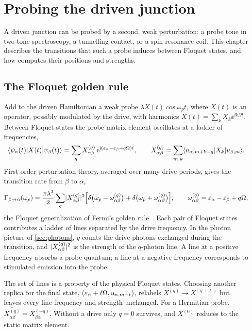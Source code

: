 \chapter{Probing the driven junction}\label{ch:probes}

A driven junction can be probed by a second, weak perturbation: a probe tone in two-tone
spectroscopy, a tunnelling contact, or a spin-resonance coil. This chapter describes the
transitions that such a probe induces between Floquet states, and how \pkg{} computes
their positions and strengths.

\section{The Floquet golden rule}

Add to the driven Hamiltonian a weak probe $\lambda X(t)\cos\omega_pt$, where $X(t)$ is an
operator, possibly modulated by the drive, with harmonics $X(t)=\sum_kX_k\ee^{\ii k\Omega t}$.
Between Floquet states the probe matrix element oscillates at a ladder of frequencies,
\begin{equation}\label{eq:floquet-element}
  \langle \psi_\alpha(t)\vert X(t)\vert \psi_\beta(t)\rangle=\sum_qX^{(q)}_{\alpha\beta}\,
  \mathrm{e}^{\mathrm{i}(\varepsilon_\alpha-\varepsilon_\beta+q\Omega)t},\qquad
  X^{(q)}_{\alpha\beta}=\sum_{m,k}\langle u_{\alpha,m+k-q}\vert X_k\vert u_{\beta,m}\rangle .
\end{equation}
First-order perturbation theory, averaged over many drive periods, gives the transition rate
from $\beta$ to $\alpha$,
\begin{equation}\label{eq:floquet-golden}
  \Gamma_{\beta\to\alpha}(\omega_p)=\frac{\pi\lambda^2}2\sum_q\lvert X^{(q)}_{\alpha\beta}\rvert^2
  \Bigl[\delta\bigl(\omega_p-\omega^{(q)}_{\alpha\beta}\bigr)+\delta\bigl(\omega_p+\omega^{(q)}_{\alpha\beta}\bigr)\Bigr],
  \qquad \omega^{(q)}_{\alpha\beta}=\varepsilon_\alpha-\varepsilon_\beta+q\Omega ,
\end{equation}
the Floquet generalization of Fermi's golden rule~\cite{grifoni1998driven,kohler2005driven}.
Each pair of Floquet states contributes a ladder of lines separated by the drive frequency.
In the photon picture of \cref{sec:photons}, $q$ counts the drive photons exchanged during
the transition, and $\lvert X^{(q)}_{\alpha\beta}\rvert^2$ is the strength of the $q$-photon line. A
line at a positive frequency absorbs a probe quantum; a line at a negative frequency
corresponds to stimulated emission into the probe.

The set of lines is a property of the physical Floquet states. Choosing another replica for
the final state, $(\varepsilon_\alpha+\ell\Omega,u_{\alpha,m-\ell})$, relabels $X^{(q)}\to
X^{(q+\ell)}$ but leaves every line frequency and strength unchanged. For a Hermitian probe,
$\overline{X^{(q)}_{\alpha\beta}}=X^{(-q)}_{\beta\alpha}$. Without a drive only $q=0$
survives, and $X^{(0)}$ reduces to the static matrix element.

